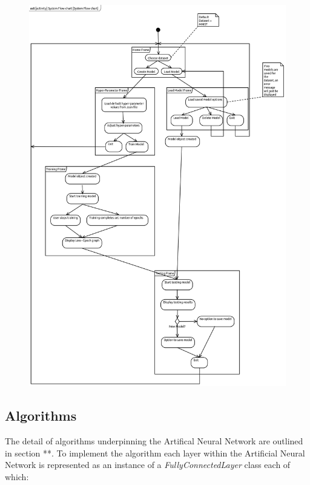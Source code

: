 \documentclass[./project-report/src/latex/project-report.tex]{subfiles}
\begin{document}
\begin{figure}[h!]
\centering
\includegraphics[width=1\textwidth]{./project-report/src/images/system-flow-chart.png}
\end{figure}

\subsection{Algorithms}

The detail of algorithms underpinning the Artifical Neural Network are outlined in section **. To implement the algorithm each layer within the Artificial Neural Network is 
represented as an instance of a \textit{FullyConnectedLayer} class each of which:
\end{document}
